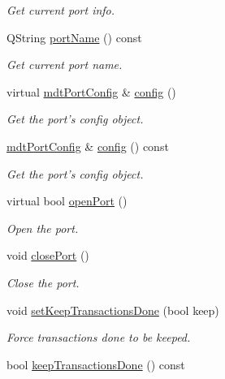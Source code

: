 \begin{DoxyCompactItemize}
\begin{DoxyCompactList}\small\item\em Get current port info. \end{DoxyCompactList}\item 
\hypertarget{classmdt_port_manager_af4fcab6aaad98d74aeabfc972da1d406}{
QString \hyperlink{classmdt_port_manager_af4fcab6aaad98d74aeabfc972da1d406}{portName} () const }
\label{classmdt_port_manager_af4fcab6aaad98d74aeabfc972da1d406}

\begin{DoxyCompactList}\small\item\em Get current port name. \end{DoxyCompactList}\item 
virtual \hyperlink{classmdt_port_config}{mdtPortConfig} \& \hyperlink{classmdt_port_manager_a9cf3ea2da38f81682695b37448712ffd}{config} ()
\begin{DoxyCompactList}\small\item\em Get the port's config object. \end{DoxyCompactList}\item 
\hyperlink{classmdt_port_config}{mdtPortConfig} \& \hyperlink{classmdt_port_manager_a735b7dc766fc2f45fb2cf9772c4201b0}{config} () const 
\begin{DoxyCompactList}\small\item\em Get the port's config object. \end{DoxyCompactList}\item 
virtual bool \hyperlink{classmdt_port_manager_aab594613e8985590c835194efbc27b5e}{openPort} ()
\begin{DoxyCompactList}\small\item\em Open the port. \end{DoxyCompactList}\item 
void \hyperlink{classmdt_port_manager_ace8065f1f5083041ee7f65c2892bc77d}{closePort} ()
\begin{DoxyCompactList}\small\item\em Close the port. \end{DoxyCompactList}\item 
void \hyperlink{classmdt_port_manager_a9adb5098766c9df588bc9978b00c5eb2}{setKeepTransactionsDone} (bool keep)
\begin{DoxyCompactList}\small\item\em Force transactions done to be keeped. \end{DoxyCompactList}\item 
\hypertarget{classmdt_port_manager_a798ce0939234870ae3b9995108e54380}{
bool \hyperlink{classmdt_port_manager_a798ce0939234870ae3b9995108e54380}{keepTransactionsDone} () const }
\label{classmdt_port_manager_a798ce0939234870ae3b9995108e54380}


\end{DoxyCompactItemize}
